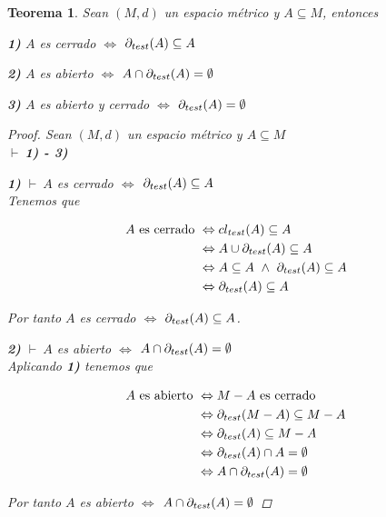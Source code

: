 \documentclass[oneside]{book} %
\theoremstyle{Teorema}
\newtheorem{Teorema}[Definicion]{Teorema}
\theoremstyle{Ejemplos}
\theoremstyle{[Obs]}
\def \test {test}
\newcommand{\cerradura}[2][\test]{\ifx \test #1 {\overline{#2}} \else {cl_{#1}(#2)} \fi} %
\newcommand{\frontera}[2][\test]{\ifx \test #1 {\partial(#2)} \else {\partial_{#1}(#2)} \fi} %
\renewcommand{\{}{\left\lbrace} %
\renewcommand{\}}{\right\rbrace} %
\newcommand{\y}{\ \wedge\ } %
\renewcommand{\u}{\cup} %
\newcommand{\n}{\cap} %
\renewcommand{\sc}{\subseteq} %
\newcommand{\pd}{$\vdash\ $} %
\begin{document}
			\begin{Teorema}\setlength{\parindent}{0em}
			
				Sean $(M, d)$ un espacio métrico y $A \sc M$, entonces 

				\textbf{1)} $A$ es cerrado $\Leftrightarrow$ $\frontera{A} \sc A$ 

				\textbf{2)} $A$ es abierto $\Leftrightarrow$ $A \n \frontera{A} = \emptyset$ 

				\textbf{3)} $A$ es abierto y cerrado $\Leftrightarrow$ $\frontera{A} = \emptyset$
 
				\begin{proof}
					
					Sean $(M, d)$ un espacio métrico y $A \sc M$ \\ 
					\pd \textbf{1) - 3)}

					\textbf{1)} \pd $A$ es cerrado $\Leftrightarrow$ $\frontera{A} \sc A$ \\ 
					Tenemos que 

					\begin{align*}
						A \text{ es cerrado } & \Leftrightarrow \cerradura{A} \sc A \\ 
						& \Leftrightarrow A \u \frontera{A} \sc A \\ 
						& \Leftrightarrow A \sc A \y \frontera{A} \sc A \\ 
						& \Leftrightarrow \frontera{A} \sc A 
					\end{align*}

					Por tanto $A$ es cerrado $\Leftrightarrow$ $\frontera{A} \sc A$.

					\textbf{2)} \pd $A$ es abierto $\Leftrightarrow$ $A \n \frontera{A} = \emptyset$ \\ 
					Aplicando \textbf{1)} tenemos que 

					\begin{align*}
						A \text{ es abierto } & \Leftrightarrow M - A \text{ es cerrado } \\
						& \Leftrightarrow \frontera{M - A} \sc M - A \\ 
						& \Leftrightarrow \frontera{A} \sc M - A \\ 
						& \Leftrightarrow \frontera{A} \n A = \emptyset \\ 
						& \Leftrightarrow A \n \frontera{A} = \emptyset
					\end{align*}

					Por tanto $A$ es abierto $\Leftrightarrow$ $A \n \frontera{A} = \emptyset$
					

\end{proof}
\end{Teorema}
\end{document}
